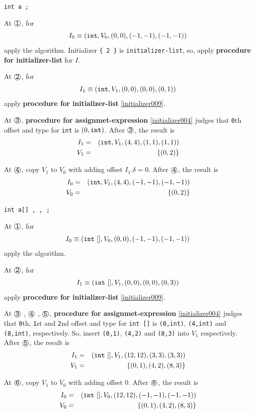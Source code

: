 \begin{Example}
\label{initializer001}
{{\tt int a 
;}}

\noindent
At $\MARU{\tt 1}$, for
\[
I_0 \equiv ({\tt{int}},V_0,(0,0),(-1,-1),(-1,-1))
\]
apply the algorithm. 
Initializer {\tt \{ 2 \}}
is {\tt initializer-list}, so, apply
 {\bf procedure for initializer-list} for $I$.

\noindent
At $\MARU{\tt 2}$, for
\[
I_1 \equiv ({\tt{int}},V_1,(0,0),(0,0),(0,1))
\]
apply {\bf procedure for initializer-list} \ref{initializer009}.

\noindent
At $\MARU{\tt 3}$, {\bf procedure for assignmet-expression}
\ref{initializer004} judges that 
{\tt{0}}th offset and type for {\tt{int}} is $(0,{\tt{int}})$. 
After $\MARU{\tt 3}$, the result is
\begin{eqnarray*}
I_1 & = & ({\tt{int}},V_1,(4,4),(1,1),(1,1)) \\
V_1 & = & \{(0,2)\}
\end{eqnarray*}

\noindent
At $\MARU{\tt 4}$,
copy $V_1$ to  $V_0$ with adding offset $I_1.\delta = 0$.
After $\MARU{\tt 4}$, the result is
\begin{eqnarray*}
I_0 & = & ({\tt{int}},V_1,(4,4),(-1,-1),(-1,-1)) \\
V_0 & = & \{(0,2)\}
\end{eqnarray*}
\end{Example}

\begin{Example}
\label{initializer002}
{\tt int a[]  
,
,
;}

\noindent
At $\MARU{\tt 1}$, for
\[
I_0 \equiv ({\tt int\,\,[]}, V_0, (0,0),(-1,-1),(-1,-1))
\]
apply the algorithm.

\noindent
At $\MARU{\tt 2}$, for
\[
I_1 \equiv ({\tt int\,\,[]}, V_1, (0,0),(0,0),(0,3))
\]
apply {\bf procedure for initializer-list} \ref{initializer009}.

\noindent
At $\MARU{\tt 3}$ , $\MARU{\tt 4}$ , $\MARU{\tt 5}$,
{\bf procedure for assignmet-expression} \ref{initializer004} 
judges that {\tt{0}}th, {\tt{1}}st and {\tt{2}}nd
offset and type for {\tt int []} is 
{\tt (0,int)}, {\tt (4,int)} and {\tt (8,int)}, respectively.
So, insert {\tt (0,1)}, {\tt (4,2)} and {\tt (8,3)} into $V_1$ respectively.
After $\MARU{\tt 5}$, the result is
\begin{eqnarray*}
I_1 & = & ({\tt{int\,\,[]}},V_1,(12,12),(3,3),(3,3)) \\
V_1 & = & \{(0,1), (4,2), (8,3)\}
\end{eqnarray*}

\noindent
At $\MARU{\tt 6}$, copy $V_1$ to  $V_0$ with adding offset $0$.
After $\MARU{\tt 6}$, the result is
\begin{eqnarray*}
I_0 & = & ({\tt{int\,\,[]}},V_0,(12,12),(-1,-1),(-1,-1)) \\
V_0 & = & \{(0,1), (4,2), (8,3)\}
\end{eqnarray*}
\end{Example}

